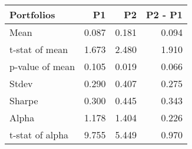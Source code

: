 \begin{tabular}{lrrr}
\toprule
Portfolios & P1 & P2 & P2 - P1 \\
\midrule
Mean & 0.087 & 0.181 & 0.094 \\
t-stat of mean & 1.673 & 2.480 & 1.910 \\
p-value of mean & 0.105 & 0.019 & 0.066 \\
Stdev & 0.290 & 0.407 & 0.275 \\
Sharpe & 0.300 & 0.445 & 0.343 \\
Alpha & 1.178 & 1.404 & 0.226 \\
t-stat of alpha & 9.755 & 5.449 & 0.970 \\
\bottomrule
\end{tabular}
